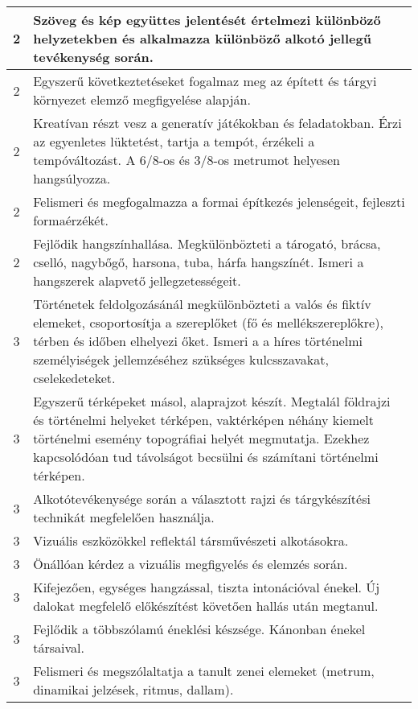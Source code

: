 \begin{longtable}{c | p{12cm} }
                                          2 &  Szöveg és kép együttes jelentését értelmezi különböző helyzetekben és alkalmazza különböző alkotó jellegű tevékenység során. \\ \hline
                                          2 &  Egyszerű következtetéseket fogalmaz meg az épített és tárgyi környezet elemző megfigyelése alapján. \\ \hline
                                          2 &  Kreatívan részt vesz a generatív játékokban és feladatokban. Érzi az egyenletes lüktetést, tartja a tempót, érzékeli a tempóváltozást. A 6/8-os és 3/8-os metrumot helyesen hangsúlyozza. \\ \hline
                                          2 &  Felismeri és megfogalmazza a formai építkezés jelenségeit, fejleszti formaérzékét. \\ \hline
                                          2 &  Fejlődik hangszínhallása. Megkülönbözteti a tárogató, brácsa, cselló, nagybőgő, harsona, tuba, hárfa hangszínét. Ismeri a hangszerek alapvető jellegzetességeit. \\ \hline
                                      
                                
                                          3 &  Történetek feldolgozásánál megkülönbözteti a valós és fiktív elemeket, csoportosítja a szereplőket (fő és mellékszereplőkre), térben és időben elhelyezi őket. Ismeri a a híres történelmi személyiségek jellemzéséhez szükséges kulcsszavakat, cselekedeteket. \\ \hline
                                          3 &  Egyszerű térképeket másol, alaprajzot készít. Megtalál földrajzi és történelmi helyeket térképen, vaktérképen néhány kiemelt történelmi esemény topográfiai helyét megmutatja. Ezekhez kapcsolódóan tud távolságot becsülni és számítani történelmi térképen. \\ \hline
                                          3 &  Alkotótevékenysége során a választott rajzi és tárgykészítési technikát megfelelően használja. \\ \hline
                                          3 &  Vizuális eszközökkel reflektál társművészeti alkotásokra. \\ \hline
                                          3 &  Önállóan kérdez a vizuális megfigyelés és elemzés során. \\ \hline
                                          3 &  Kifejezően, egységes hangzással, tiszta intonációval énekel. Új dalokat megfelelő előkészítést követően hallás után megtanul. \\ \hline
                                          3 &  Fejlődik a többszólamú éneklési készsége. Kánonban énekel társaival. \\ \hline
                                          3 &  Felismeri és megszólaltatja a tanult zenei elemeket (metrum, dinamikai jelzések, ritmus, dallam). \\ \hline
                                      

\end{longtable}
